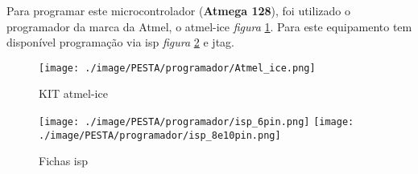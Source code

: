 Para programar este microcontrolador (\textbf{Atmega 128}), foi utilizado o programador da marca da Atmel, o \ac{atmel-ice} \textit{figura} \ref{Programador_1}. Para este equipamento tem disponível programação via \ac{isp} \textit{figura} \ref{ISP_6_8_10pin} e \ac{jtag}.
\begin{minipage}[!b]{.5\linewidth}
	\begin{figure}[H]
		\captionsetup{justification=raggedright,singlelinecheck=false}
		\flushleft
		\texttt{[image: ./image/PESTA/programador/Atmel\_ice.png]}
		\caption{KIT \acs{atmel-ice}}
		\label{Programador_1}
	\end{figure}
\end{minipage}
\hspace{.5cm}
\begin{minipage}[!b]{.5\linewidth}
	\begin{figure}[H]
		\captionsetup{justification=raggedright,singlelinecheck=false}
		\flushleft
		\texttt{[image: ./image/PESTA/programador/isp\_6pin.png]}
		\texttt{[image: ./image/PESTA/programador/isp\_8e10pin.png]}
		\caption{Fichas \acs{isp}}
		\label{ISP_6_8_10pin}
	\end{figure}
\end{minipage}
